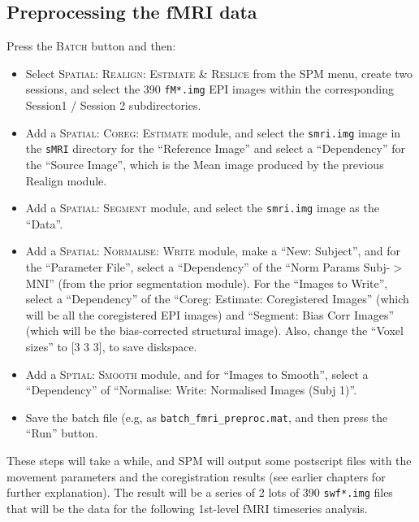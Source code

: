 \subsection{Preprocessing the fMRI data}

Press the \textsc{Batch} button and then:

\begin{itemize}
\item Select \textsc{Spatial: Realign: Estimate \& Reslice} from the SPM menu, create two sessions, and select the 390 \texttt{fM*.img} EPI images within the corresponding Session1 / Session 2 subdirectories.

\item Add a \textsc{Spatial: Coreg: Estimate} module, and select the \texttt{smri.img} image in the \texttt{sMRI} directory for the ``Reference Image'' and select a ``Dependency'' for the ``Source Image'', which is the Mean image produced by the previous Realign module.

\item Add a \textsc{Spatial: Segment} module, and select the \texttt{smri.img} image as the ``Data''.

\item Add a \textsc{Spatial: Normalise: Write} module, make a ``New: Subject'', and for the ``Parameter File'', select a ``Dependency'' of the ``Norm Params Subj-$>$MNI'' (from the prior segmentation module). For the ``Images to Write'', select a ``Dependency'' of the ``Coreg: Estimate: Coregistered Images'' (which will be all the coregistered EPI images) and ``Segment: Bias Corr Images'' (which will be the bias-corrected structural image). Also, change the ``Voxel sizes'' to [3 3 3], to save diskspace.

\item Add a \textsc{Sptial: Smooth} module, and for ``Images to Smooth'', select a ``Dependency'' of ``Normalise: Write: Normalised Images (Subj 1)''.

\item Save the batch file (e.g, as \texttt{batch\_fmri\_preproc.mat}, and then press the ``Run'' button.
\end{itemize}

These steps will take a while, and SPM will output some postscript files with the movement parameters and the coregistration results (see earlier chapters for further explanation). The result will be a series of 2 lots of 390 \texttt{swf*.img} files that will be the data for the following 1st-level fMRI timeseries analysis.

